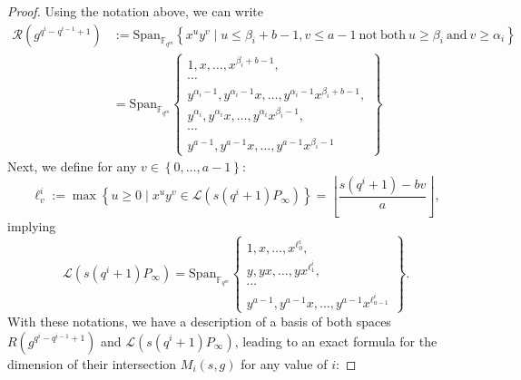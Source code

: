\documentclass[a4paper]{article}
\theoremstyle{definition}
\theoremstyle{remark}
\newcommand{\calL}{\mathcal{L}}
\newcommand{\calR}{\mathcal{R}}
\newcommand{\fqm}{\mathbb{F}_{q^m}}
\newcommand{\set}[1]{\left\{#1\right\}}
\newcommand{\degab}[1]{\deg_{a,b}\left(#1\right)}
\begin{document}
\begin{proof}


Using the notation above, we can write
\begin{align*}
\calR\left(g^{q^i-q^{i-1}+1}\right) &:= \mathrm{Span}_{\fqm} \left\{x^uy^v \mid u \leq \beta_i+b-1 , v \leq a-1 \ \mathrm{not \ both} \ u \geq \beta_i \ \mathrm{and} \ v \geq \alpha_i\right\} \\
&= \mathrm{Span}_{\fqm}    \left\{ \begin{array}{c}
         1,x,\dots,x^{\beta_i +b-1},   \\
         \cdots \\
         y^{\alpha_i -1},y^{\alpha_i -1}x,\dots,y^{\alpha_i -1}x^{\beta_i +b-1}, \\
          y^{\alpha_i},y^{\alpha_i}x,\dots,y^{\alpha_i}x^{\beta_i-1}, \\
         \cdots \\
         y^{a-1},y^{a-1}x,\dots,y^{a-1}x^{\beta_i-1}
    \end{array}
    \right\}
\end{align*}
Next, we define for any $v \in \set{0,\dots,a-1}$:
$$\ell^i_v := \max \set{u \geq 0 \mid x^uy^v \in \calL(s(q^i+1)P_\infty)} = \left\lfloor \dfrac{s(q^i+1)-bv}{a}\right\rfloor,$$
implying
\begin{equation*}
\calL(s(q^i+1)P_\infty) = \mathrm{Span}_{\fqm}    \left\{ \begin{array}{c}
         1,x,\dots,x^{\ell^i_0},   \\
         y,yx,\dots,yx^{\ell^i_1}, \\
         \cdots \\
         y^{a-1},y^{a-1}x,\dots,y^{a-1}x^{\ell^i_{a-1}}
    \end{array}
    \right\}.
\end{equation*}
With these notations, we have a description of a basis of both spaces $R(g^{q^i-q^{i-1}+1})$ and $\calL(s(q^i+1)P_\infty)$, leading to an exact formula for the dimension of their intersection $M_i(s,g)$ for any value of $i$:


\end{proof}
\end{document}
